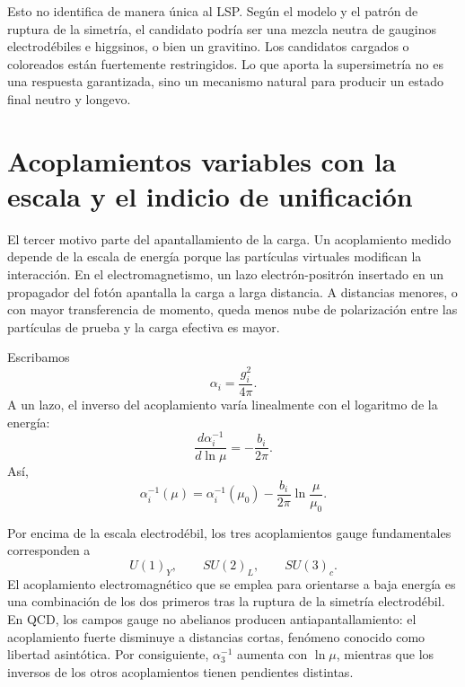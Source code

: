 Esto no identifica de manera única al LSP. Según el modelo y el patrón de ruptura de la simetría, el candidato podría ser una mezcla neutra de gauginos electrodébiles e higgsinos, o bien un gravitino. Los candidatos cargados o coloreados están fuertemente restringidos. Lo que aporta la supersimetría no es una respuesta garantizada, sino un mecanismo natural para producir un estado final neutro y longevo.

\section{Acoplamientos variables con la escala y el indicio de unificación}

El tercer motivo parte del apantallamiento de la carga. Un acoplamiento medido depende de la escala de energía porque las partículas virtuales modifican la interacción. En el electromagnetismo, un lazo electrón-positrón insertado en un propagador del fotón apantalla la carga a larga distancia. A distancias menores, o con mayor transferencia de momento, queda menos nube de polarización entre las partículas de prueba y la carga efectiva es mayor.

Escribamos
\begin{equation}
\alpha_i=\frac{g_i^2}{4\pi}.
\end{equation}
A un lazo, el inverso del acoplamiento varía linealmente con el logaritmo de la energía:
\begin{equation}
\frac{d\alpha_i^{-1}}{d\ln\mu}
=-\frac{b_i}{2\pi}.
\end{equation}
Así,
\begin{equation}
\alpha_i^{-1}(\mu)
=\alpha_i^{-1}(\mu_0)
-\frac{b_i}{2\pi}\ln\frac{\mu}{\mu_0}.
\end{equation}

Por encima de la escala electrodébil, los tres acoplamientos gauge fundamentales corresponden a
\begin{equation}
U(1)_Y,\qquad SU(2)_L,\qquad SU(3)_c.
\end{equation}
El acoplamiento electromagnético que se emplea para orientarse a baja energía es una combinación de los dos primeros tras la ruptura de la simetría electrodébil. En QCD, los campos gauge no abelianos producen antiapantallamiento: el acoplamiento fuerte disminuye a distancias cortas, fenómeno conocido como libertad asintótica. Por consiguiente, \(\alpha_3^{-1}\) aumenta con \(\ln\mu\), mientras que los inversos de los otros acoplamientos tienen pendientes distintas.

